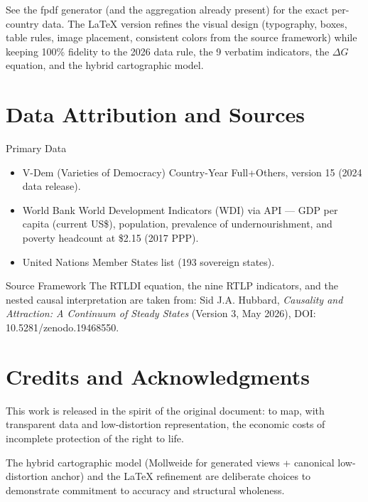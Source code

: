 \documentclass[11pt,a4paper]{book}
\begin{document}
See the fpdf generator (and the aggregation already present) for the exact per-country data. The LaTeX version refines the visual design (typography, boxes, table rules, image placement, consistent colors from the source framework) while keeping 100\% fidelity to the 2026 data rule, the 9 verbatim indicators, the $\Delta G$ equation, and the hybrid cartographic model.

\chapter*{Data Attribution and Sources}

Primary Data
\begin{itemize}
  \item V-Dem (Varieties of Democracy) Country-Year Full+Others, version 15 (2024 data release).
  \item World Bank World Development Indicators (WDI) via API — GDP per capita (current US\$), population, prevalence of undernourishment, and poverty headcount at \$2.15 (2017 PPP).
  \item United Nations Member States list (193 sovereign states).
\end{itemize}

Source Framework
The RTLDI equation, the nine RTLP indicators, and the nested causal interpretation are taken from:
Sid J.A. Hubbard, \textit{Causality and Attraction: A Continuum of Steady States} (Version 3, May 2026), DOI: 10.5281/zenodo.19468550.

\chapter*{Credits and Acknowledgments}
This work is released in the spirit of the original document: to map, with transparent data and low-distortion representation, the economic costs of incomplete protection of the right to life.

The hybrid cartographic model (Mollweide for generated views + canonical low-distortion anchor) and the LaTeX refinement are deliberate choices to demonstrate commitment to accuracy and structural wholeness.
\end{document}
